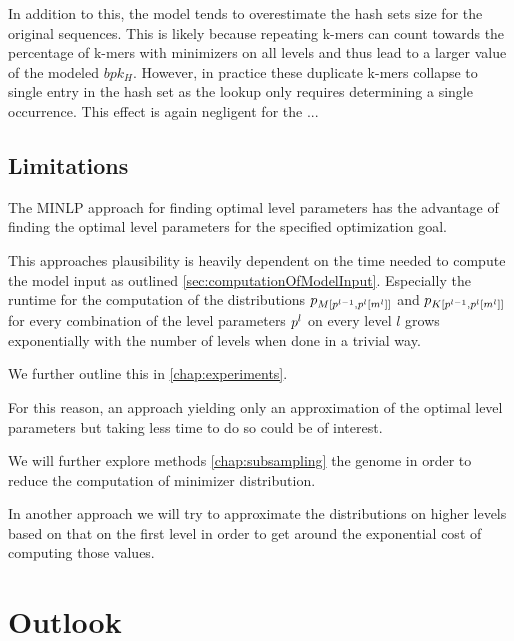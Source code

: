 \documentclass[a4paper,titlepage,onecolumn,oneside,12pt,nenglish,titlepage=firstiscover]{scrbook}
\theoremstyle{plain} %
\theoremstyle{definition} %
\theoremstyle{remark} %
\theoremstyle{plain}
\newcommand{\level}{l}
\begin{document}
In addition to this, the model tends to overestimate the hash sets size for the original sequences. This is likely because repeating k-mers can count towards the percentage of k-mers with \infrequent minimizers on all levels and thus lead to a larger value of the modeled $bpk_H$. However, in practice these duplicate k-mers collapse to single entry in the hash set as the lookup only requires determining a single occurrence. This effect is again negligent for the ...

\section{Limitations}
The MINLP approach for finding optimal level parameters has the advantage of finding the optimal level parameters for the specified optimization goal.

This approaches plausibility is heavily dependent on the time needed to compute the model input as outlined \cref{sec:computationOfModelInput}. Especially the runtime for the computation of the distributions $\probabilityDistribution{\ZVM{\level}}$ and $\probabilityDistribution{\ZVK{\level}}$ for every combination of the level parameters $\levelParameters{\level}$ on every level $\level$ grows exponentially with the number of levels when done in a trivial way.

We further outline this in \cref{chap:experiments}.

For this reason, an approach yielding only an approximation of the optimal level parameters but taking less time to do so could be of interest.

We will further explore methods \cref{chap:subsampling} the genome in order to reduce the computation of minimizer distribution.

In another approach we will try to approximate the distributions on higher levels based on that on the first level in order to get around the exponential cost of computing those values.

\chapter{Outlook} \label{chap:outlook}
\end{document}
